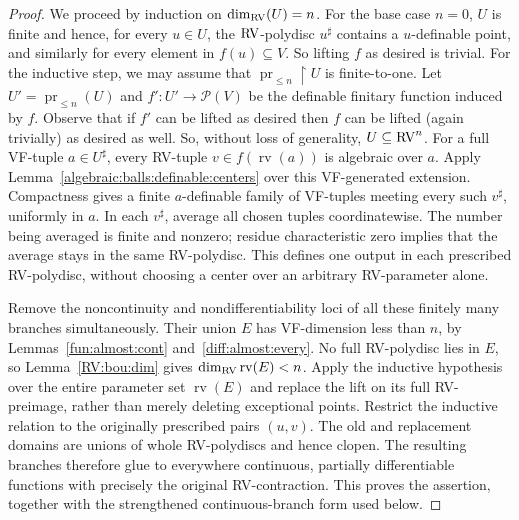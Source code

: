 \documentclass[12pt]{amsart}
\theoremstyle{plain}
\theoremstyle{definition}
\theoremstyle{remark}
\numberwithin{equation}{section}
\theoremstyle{plain}
\newcommand{\RV}{\textup{RV}}
\DeclareMathOperator{\pr}{pr}
\newcommand{\0}{\emptyset}
\newcommand{\mdl}[1]{\mathcal{#1}}  %
\newcommand{\rest}{\upharpoonright}
\newcommand{\fun}{\longrightarrow}
\newcommand{\sub}{\subseteq}
\DeclareMathOperator{\rv}{rv}
\begin{document}
\begin{proof}
We proceed by induction on $\dim_{\RV}(U) = n$. For the base case $n=0$, $U$ is finite and hence, for every $u \in U$, the $\RV$-polydisc $u^\sharp$ contains a $u$-definable point, and similarly for every element in $f(u) \sub V$. So lifting $f$ as desired is trivial. For the inductive step, we may assume that $\pr_{\leq n} \rest U$ is finite-to-one. Let $U' = \pr_{\leq n}(U)$ and $f' : U' \fun \mdl P(V)$ be the definable finitary function induced by $f$. Observe that if $f'$ can be lifted as desired then  $f$ can be lifted (again trivially) as desired as well. So, without loss of generality,  $U \sub \RV^n$. For a full VF-tuple $a\in U^\sharp$, every RV-tuple $v\in f(\rv(a))$ is algebraic over $a$. Apply Lemma~\ref{algebraic:balls:definable:centers} over this VF-generated extension. Compactness gives a finite $a$-definable family of VF-tuples meeting every such $v^\sharp$, uniformly in $a$. In each $v^\sharp$, average all chosen tuples coordinatewise. The number being averaged is finite and nonzero; residue characteristic zero implies that the average stays in the same RV-polydisc. This defines one output in each prescribed RV-polydisc, without choosing a center over an arbitrary RV-parameter alone.

Remove the noncontinuity and nondifferentiability loci of all these finitely many branches simultaneously. Their union $E$ has VF-dimension less than $n$, by Lemmas~\ref{fun:almost:cont} and~\ref{diff:almost:every}. No full RV-polydisc lies in $E$, so Lemma~\ref{RV:bou:dim} gives $\dim_{\RV}\rv(E)<n$. Apply the inductive hypothesis over the entire parameter set $\rv(E)$ and replace the lift on its full RV-preimage, rather than merely deleting exceptional points. Restrict the inductive relation to the originally prescribed pairs $(u,v)$. The old and replacement domains are unions of whole RV-polydiscs and hence clopen. The resulting branches therefore glue to everywhere continuous, partially differentiable functions with precisely the original RV-contraction. This proves the assertion, together with the strengthened continuous-branch form used below.
\end{proof}
\end{document}
